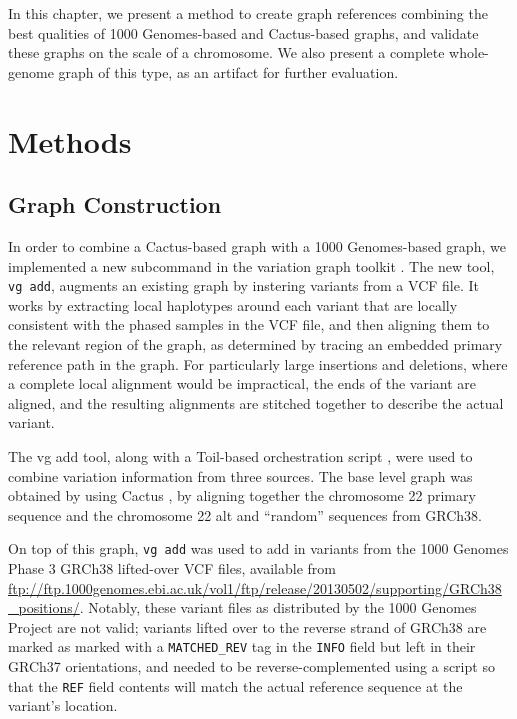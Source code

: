 In this chapter, we present a method to create graph references combining the best qualities of 1000 Genomes-based and Cactus-based graphs, and validate these graphs on the scale of a chromosome. We also present a complete whole-genome graph of this type, as an artifact for further evaluation. 

\section{Methods}

\subsection{Graph Construction}

In order to combine a Cactus-based graph with a 1000 Genomes-based graph, we implemented a new subcommand in the \vg variation graph toolkit \cite{garrison2016vg}. The new tool, \texttt{vg add}, augments an existing graph by instering variants from a VCF file. It works by extracting local haplotypes around each variant that are locally consistent with the phased samples in the VCF file, and then aligning them to the relevant region of the graph, as determined by tracing an embedded primary reference path in the graph. For particularly large insertions and deletions, where a complete local alignment would be impractical, the ends of the variant are aligned, and the resulting alignments are stitched together to describe the actual variant.

The vg add tool, along with a Toil-based orchestration script \cite{vivian2017toil}, were used to combine variation information from three sources. The base level graph was obtained by using Cactus \cite{paten2011cactus2}, by aligning together the chromosome 22 primary sequence and the chromosome 22 alt and ``random'' sequences from GRCh38.

On top of this graph, \texttt{vg add} was used to add in variants from the 1000 Genomes Phase 3 GRCh38 lifted-over VCF files, available from \url{ftp://ftp.1000genomes.ebi.ac.uk/vol1/ftp/release/20130502/supporting/GRCh38_positions/}. Notably, these variant files as distributed by the 1000 Genomes Project are not valid; variants lifted over to the reverse strand of GRCh38 are marked as marked with a \texttt{MATCHED\_REV} tag in the \texttt{INFO} field but left in their GRCh37 orientations, and needed to be reverse-complemented using a script so that the \texttt{REF} field contents will match the actual reference sequence at the variant's location.

